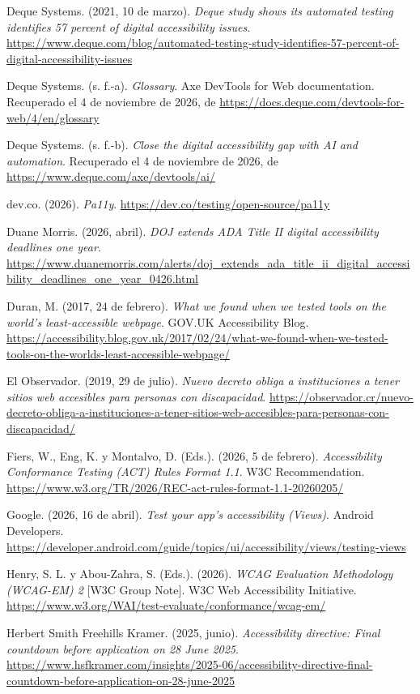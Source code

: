 \documentclass[10pt,letterpaper,onecolumn]{IEEEtran}
\begin{document}
Deque Systems. (2021, 10 de marzo). \emph{Deque study shows its automated testing identifies 57 percent of digital accessibility issues}. \url{https://www.deque.com/blog/automated-testing-study-identifies-57-percent-of-digital-accessibility-issues}

Deque Systems. (s. f.-a). \emph{Glossary}. Axe DevTools for Web documentation. Recuperado el 4 de noviembre de 2026, de \url{https://docs.deque.com/devtools-for-web/4/en/glossary}

Deque Systems. (s. f.-b). \emph{Close the digital accessibility gap with AI and automation}. Recuperado el 4 de noviembre de 2026, de \url{https://www.deque.com/axe/devtools/ai/}

dev.co. (2026). \emph{Pa11y}. \url{https://dev.co/testing/open-source/pa11y}

Duane Morris. (2026, abril). \emph{DOJ extends ADA Title II digital accessibility deadlines one year}. \url{https://www.duanemorris.com/alerts/doj_extends_ada_title_ii_digital_accessibility_deadlines_one_year_0426.html}

Duran, M. (2017, 24 de febrero). \emph{What we found when we tested tools on the world's least-accessible webpage}. GOV.UK Accessibility Blog. \url{https://accessibility.blog.gov.uk/2017/02/24/what-we-found-when-we-tested-tools-on-the-worlds-least-accessible-webpage/}

El Observador. (2019, 29 de julio). \emph{Nuevo decreto obliga a instituciones a tener sitios web accesibles para personas con discapacidad}. \url{https://observador.cr/nuevo-decreto-obliga-a-instituciones-a-tener-sitios-web-accesibles-para-personas-con-discapacidad/}

Fiers, W., Eng, K. y Montalvo, D. (Eds.). (2026, 5 de febrero). \emph{Accessibility Conformance Testing (ACT) Rules Format 1.1}. W3C Recommendation. \url{https://www.w3.org/TR/2026/REC-act-rules-format-1.1-20260205/}

Google. (2026, 16 de abril). \emph{Test your app's accessibility (Views)}. Android Developers. \url{https://developer.android.com/guide/topics/ui/accessibility/views/testing-views}

Henry, S. L. y Abou-Zahra, S. (Eds.). (2026). \emph{WCAG Evaluation Methodology (WCAG-EM) 2} {[}W3C Group Note{]}. W3C Web Accessibility Initiative. \url{https://www.w3.org/WAI/test-evaluate/conformance/wcag-em/}

Herbert Smith Freehills Kramer. (2025, junio). \emph{Accessibility directive: Final countdown before application on 28 June 2025}. \url{https://www.hsfkramer.com/insights/2025-06/accessibility-directive-final-countdown-before-application-on-28-june-2025}
\end{document}

